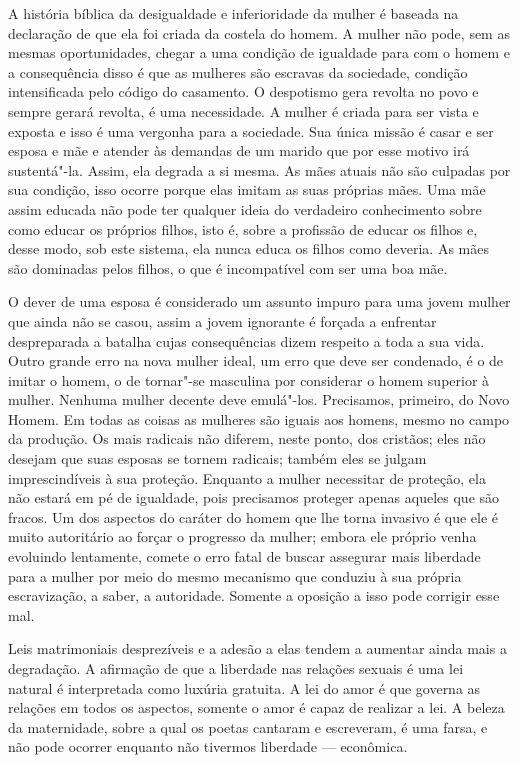A história bíblica da desigualdade e inferioridade da mulher é baseada
na declaração de que ela foi criada da costela do homem. A mulher não
pode, sem as mesmas oportunidades, chegar a uma condição de igualdade
para com o homem e a consequência disso é que as mulheres são escravas
da sociedade, condição intensificada pelo código do casamento. O
despotismo gera revolta no povo e sempre gerará revolta, é uma
necessidade. A mulher é criada para ser vista e exposta e isso é uma
vergonha para a sociedade. Sua única missão é casar e ser esposa e mãe e
atender às demandas de um marido que por esse motivo irá sustentá"-la.
Assim, ela degrada a si mesma. As mães atuais não são culpadas por
sua condição, isso ocorre porque elas imitam as suas próprias mães. Uma
mãe assim educada não pode ter qualquer ideia do verdadeiro conhecimento
sobre como educar os próprios filhos, isto é, sobre a profissão de
educar os filhos e, desse modo, sob este sistema, ela nunca educa os
filhos como deveria. As mães são dominadas pelos filhos, o que é
incompatível com ser uma boa mãe.

O dever de uma esposa é considerado um assunto impuro para uma jovem
mulher que ainda não se casou, assim a jovem ignorante é forçada a
enfrentar despreparada a batalha cujas consequências dizem respeito a toda a sua vida.
Outro grande erro na nova mulher ideal, um erro que deve ser condenado,
é o de imitar o homem, o de tornar"-se masculina por considerar o homem
superior à mulher. Nenhuma mulher decente deve emulá"-los. Precisamos,
primeiro, do Novo Homem. Em todas as coisas as mulheres são iguais aos
homens, mesmo no campo da produção. Os mais radicais não diferem, neste
ponto, dos cristãos; eles não desejam que suas esposas se tornem
radicais; também eles se julgam imprescindíveis à sua proteção. Enquanto
a mulher necessitar de proteção, ela não estará em pé de igualdade, pois
precisamos proteger apenas aqueles que são fracos. Um dos aspectos do
caráter do homem que lhe torna invasivo é que ele é muito autoritário
ao forçar o progresso da mulher; embora ele próprio venha
evoluindo lentamente, comete o erro fatal de buscar assegurar mais
liberdade para a mulher por meio do mesmo mecanismo que conduziu à sua própria
escravização, a saber, a autoridade. Somente a oposição a isso pode
corrigir esse mal.

Leis matrimoniais desprezíveis e a adesão a elas tendem a aumentar ainda
mais a degradação. A afirmação de que a liberdade nas relações sexuais é
uma lei natural é interpretada como luxúria gratuita. A lei do amor é
que governa as relações em todos os aspectos, somente o amor é capaz de
realizar a lei. A beleza da maternidade, sobre a qual os poetas cantaram
e escreveram, é uma farsa, e não pode ocorrer enquanto não tivermos
liberdade --- econômica.

